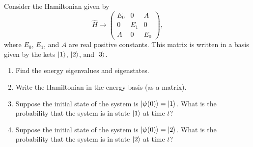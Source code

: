 \begin{problem}[Practice 2]
\label{prob_schro_practice2}

Consider the Hamiltonian given by
\[
\hat{H} \to  \begin{pmatrix} E_0 & 0 & A \\ 0 & E_1 & 0 \\ A & 0 & E_0 \end{pmatrix},
\]
where $E_0$, $E_1$, and $A$ are real positive constants.  This matrix is written in a basis given by the kets $| 1 \rangle$, $| 2 \rangle$, and $| 3 \rangle$.

\begin{enumerate}[label=(\alph*)]

\item Find the energy eigenvalues and eigenstates.

\item Write the Hamiltonian in the energy basis (as a matrix).

\item Suppose the initial state of the system is $| \psi(0) \rangle = | 1 \rangle$.  What is the probability that the system is in state $| 1 \rangle$ at time $t$?

\item Suppose the initial state of the system is $| \psi(0) \rangle = | 2 \rangle$.  What is the probability that the system is in state $| 2 \rangle$ at time $t$?

\end{enumerate}

\end{problem}
